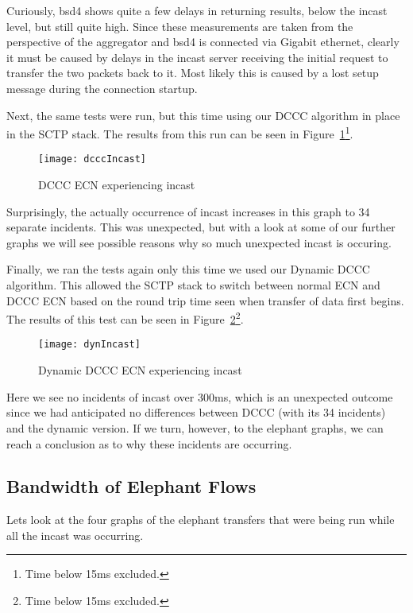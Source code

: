 \documentclass[12pt]{article}
\begin{document}
Curiously,  bsd4 shows quite a few delays in returning results, below the incast level, 
but still quite high. Since these measurements are taken from the perspective of the aggregator and
bsd4 is connected via Gigabit ethernet, clearly it must be caused by delays in the incast server
receiving the initial request to transfer the two packets back to it. Most likely this is caused by
a lost setup message during the connection startup.


Next, the same tests were run, but this time using our DCCC algorithm in place in the SCTP stack. The
results from this run can be seen in Figure~\ref{fig:dcccIncast}\footnote{Time below 15ms excluded.}.

\begin{figure}[!h]
\centering
\texttt{[image: dcccIncast]}
\caption{DCCC ECN experiencing incast}
\label{fig:dcccIncast}
\end{figure}


Surprisingly, the actually occurrence of incast increases in this graph to 34 separate incidents. This
was unexpected, but with a look at some of our further graphs we will see possible
reasons why so much unexpected incast is occuring.


Finally, we ran the tests again only this time we used our Dynamic DCCC algorithm. This allowed the
SCTP stack to switch between normal ECN and DCCC ECN based on the round trip time
seen when transfer of data first begins. The results of this test can be seen in Figure~\ref{fig:dynIncast}\footnote{Time below 15ms excluded.}.


\begin{figure}[!h]
\centering
\texttt{[image: dynIncast]}
\caption{Dynamic DCCC ECN experiencing incast}
\label{fig:dynIncast}
\end{figure}

Here we see no incidents of incast over 300ms, which is an unexpected
outcome since we had anticipated no differences between DCCC (with its 34 incidents) and
the dynamic version. If we turn, however, to the elephant graphs, we can reach a conclusion
as to why these incidents are occurring.

\pagebreak
\subsection{Bandwidth of Elephant Flows}
Lets look at the four graphs of the elephant transfers that were being run while all
the incast was occurring. 
\end{document}
